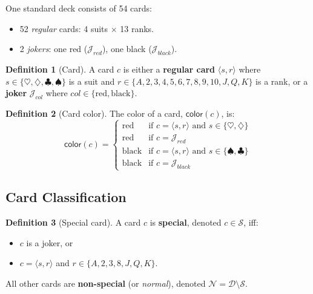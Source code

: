 \documentclass[11pt,a4paper,twoside]{article}
\theoremstyle{definition}
\newtheorem{definition}{Definition}[section]
\theoremstyle{remark}
\newcommand{\Card}[2]{\ensuremath{\langle #1, #2 \rangle}}
\newcommand{\Joker}[1]{\ensuremath{\mathcal{J}_{#1}}}
\newcommand{\Deck}{\ensuremath{\mathcal{D}}}
\newcommand{\Special}{\ensuremath{\mathcal{S}}}
\newcommand{\Normal}{\ensuremath{\mathcal{N}}}
\newcommand{\func}[1]{\ensuremath{\mathsf{#1}}}
\begin{document}
One standard deck consists of 54 cards:
\begin{itemize}[nosep]
  \item 52 \emph{regular} cards: 4 suits $\times$ 13 ranks.
  \item 2 \emph{jokers}: one red ($\Joker{red}$), one black ($\Joker{black}$).
\end{itemize}

\begin{definition}[Card]
  A card $c$ is either a \textbf{regular card} $\Card{s}{r}$ where
  $s \in \{\heartsuit, \diamondsuit, \clubsuit, \spadesuit\}$ is a suit and
  $r \in \{A,2,3,4,5,6,7,8,9,10,J,Q,K\}$ is a rank, or a
  \textbf{joker} $\Joker{col}$ where $col \in \{\text{red}, \text{black}\}$.
\end{definition}

\begin{definition}[Card color]
  The color of a card, $\func{color}(c)$, is:
  \[
  \func{color}(c) = \begin{cases}
    \text{red}   & \text{if } c = \Card{s}{r} \text{ and } s \in \{\heartsuit, \diamondsuit\} \\
    \text{red}   & \text{if } c = \Joker{red} \\
    \text{black} & \text{if } c = \Card{s}{r} \text{ and } s \in \{\spadesuit, \clubsuit\} \\
    \text{black} & \text{if } c = \Joker{black}
  \end{cases}
  \]
\end{definition}

\subsection{Card Classification}

\begin{definition}[Special card]
  A card $c$ is \textbf{special}, denoted $c \in \Special$, iff:
  \begin{itemize}[nosep]
    \item $c$ is a joker, or
    \item $c = \Card{s}{r}$ and $r \in \{A, 2, 3, 8, J, Q, K\}$.
  \end{itemize}
  All other cards are \textbf{non-special} (or \emph{normal}), denoted $\Normal = \Deck \setminus \Special$.
\end{definition}
\end{document}
